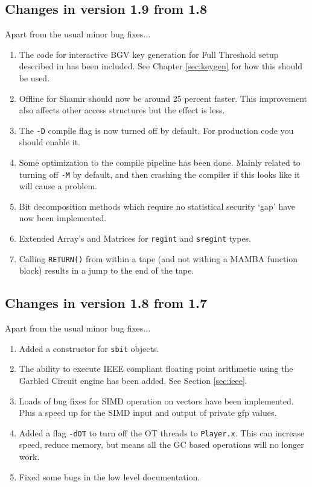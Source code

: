 \subsection{Changes in version 1.9 from 1.8}
Apart from the usual minor bug fixes...
\begin{enumerate}
\item The code for interactive BGV key generation for Full Threshold
        setup described in \cite{SPDZKG} has been included.
      See Chapter \ref{sec:keygen} for how this should be used.
\item Offline for Shamir should now be around 25 percent faster.
This improvement also affects other access structures but the effect
is less.
\item The \verb+-D+ compile flag is now turned off by default.
For production code you should enable it.
\item Some optimization to the compile pipeline has been done.
Mainly related to turning off \verb+-M+ by default,
and then crashing the compiler if this looks like
it will cause a problem.
\item Bit decomposition methods which require no statistical
security `gap' have now been implemented.
\item Extended Array's and Matrices for \verb+regint+ and \verb+sregint+ types.\
\item Calling \verb+RETURN()+ from within a tape (and not withing a MAMBA function block) results in a jump to the end of the tape.
\end{enumerate}

\subsection{Changes in version 1.8 from 1.7}
Apart from the usual minor bug fixes...
\begin{enumerate}
\item Added a constructor for \verb|sbit| objects.
\item The ability to execute IEEE compliant floating point arithmetic
      using the Garbled Circuit engine has been added. 
      See Section \ref{sec:ieee}.
\item Loads of bug fixes for SIMD operation on vectors have
      been implemented. Plus a speed up for the SIMD input and
      output of private gfp values.
\item Added a flag \verb|-dOT| to turn off the OT threads to \verb|Player.x|.
      This can increase speed, reduce memory, but means all the GC
      based operations will no longer work.
\item Fixed some bugs in the low level documentation.
\end{enumerate}

